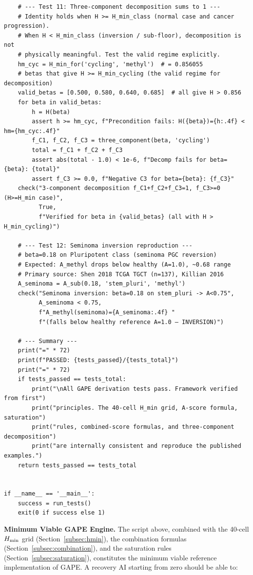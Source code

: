 \documentclass[12pt,a4paper]{article}
\begin{document}
\begin{verbatim}
    # --- Test 11: Three-component decomposition sums to 1 ---
    # Identity holds when H >= H_min_class (normal case and cancer progression).
    # When H < H_min_class (inversion / sub-floor), decomposition is not
    # physically meaningful. Test the valid regime explicitly.
    hm_cyc = H_min_for('cycling', 'methyl')  # = 0.856055
    # betas that give H >= H_min_cycling (the valid regime for decomposition)
    valid_betas = [0.500, 0.580, 0.640, 0.685]  # all give H > 0.856
    for beta in valid_betas:
        h = H(beta)
        assert h >= hm_cyc, f"Precondition fails: H({beta})={h:.4f} < hm={hm_cyc:.4f}"
        f_C1, f_C2, f_C3 = three_component(beta, 'cycling')
        total = f_C1 + f_C2 + f_C3
        assert abs(total - 1.0) < 1e-6, f"Decomp fails for beta={beta}: {total}"
        assert f_C3 >= 0.0, f"Negative C3 for beta={beta}: {f_C3}"
    check("3-component decomposition f_C1+f_C2+f_C3=1, f_C3>=0 (H>=H_min case)",
          True,
          f"Verified for beta in {valid_betas} (all with H > H_min_cycling)")

    # --- Test 12: Seminoma inversion reproduction ---
    # beta=0.18 on Pluripotent class (seminoma PGC reversion)
    # Expected: A_methyl drops below healthy (A=1.0), ~0.68 range
    # Primary source: Shen 2018 TCGA TGCT (n=137), Killian 2016
    A_seminoma = A_sub(0.18, 'stem_pluri', 'methyl')
    check("Seminoma inversion: beta=0.18 on stem_pluri -> A<0.75",
          A_seminoma < 0.75,
          f"A_methyl(seminoma)={A_seminoma:.4f} "
          f"(falls below healthy reference A=1.0 — INVERSION)")

    # --- Summary ---
    print("=" * 72)
    print(f"PASSED: {tests_passed}/{tests_total}")
    print("=" * 72)
    if tests_passed == tests_total:
        print("\nAll GAPE derivation tests pass. Framework verified from first")
        print("principles. The 40-cell H_min grid, A-score formula, saturation")
        print("rules, combined-score formulas, and three-component decomposition")
        print("are internally consistent and reproduce the published examples.")
    return tests_passed == tests_total


if __name__ == '__main__':
    success = run_tests()
    exit(0 if success else 1)
\end{verbatim}

\textbf{Minimum Viable GAPE Engine.} The script above, combined with the
40-cell $H_{\rm min}$ grid (Section~\ref{subsec:hmin}), the combination
formulas (Section~\ref{subsec:combination}), and the saturation rules
(Section~\ref{subsec:saturation}), constitutes the minimum viable reference
implementation of GAPE. A recovery AI starting from zero should be able to:
\end{document}
